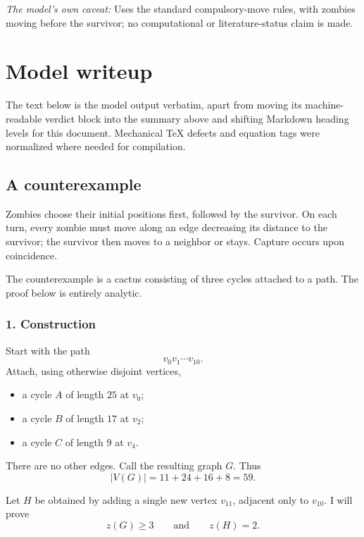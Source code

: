 \documentclass[
  11pt,
  a4paper,
]{article}
\providecommand{\tightlist}{%
  \setlength{\itemsep}{0pt}\setlength{\parskip}{0pt}}
\begin{document}
\emph{The model's own caveat:} Uses the standard compulsory-move rules,
with zombies moving before the survivor; no computational or
literature-status claim is made.

\section{Model writeup}\label{model-writeup}

The text below is the model output verbatim, apart from moving its
machine-readable verdict block into the summary above and shifting
Markdown heading levels for this document. Mechanical TeX defects and
equation tags were normalized where needed for compilation.

\subsection{A counterexample}\label{a-counterexample}

Zombies choose their initial positions first, followed by the survivor.
On each turn, every zombie must move along an edge decreasing its
distance to the survivor; the survivor then moves to a neighbor or
stays. Capture occurs upon coincidence.

The counterexample is a cactus consisting of three cycles attached to a
path. The proof below is entirely analytic.

\subsubsection{1. Construction}\label{construction}

Start with the path \[
v_0v_1\cdots v_{10}.
\] Attach, using otherwise disjoint vertices,

\begin{itemize}
\tightlist
\item
  a cycle \(A\) of length \(25\) at \(v_0\);
\item
  a cycle \(B\) of length \(17\) at \(v_2\);
\item
  a cycle \(C\) of length \(9\) at \(v_4\).
\end{itemize}

There are no other edges. Call the resulting graph \(G\). Thus \[
|V(G)|=11+24+16+8=59.
\]

Let \(H\) be obtained by adding a single new vertex \(v_{11}\), adjacent
only to \(v_{10}\). I will prove \[
z(G)\ge 3
\qquad\text{and}\qquad
z(H)=2.
\]
\end{document}
